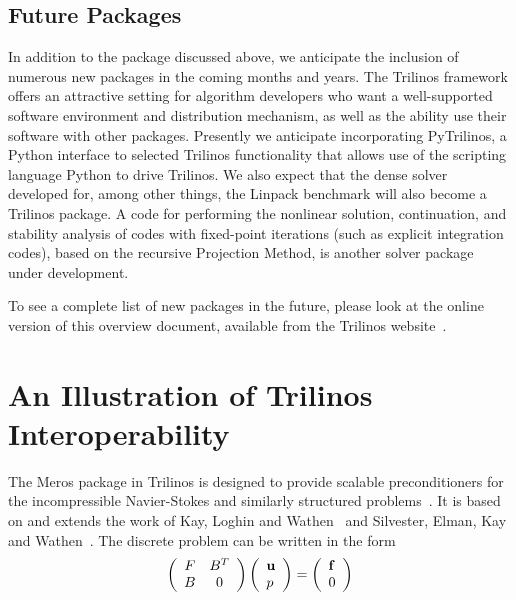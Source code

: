 \documentclass[acmtoms,acmnow]{acmtrans2m}
\begin{document}
\subsection{Future Packages}

In addition to the package discussed above, we anticipate the
inclusion of numerous new packages in the coming months and years.
The Trilinos framework offers an attractive setting for algorithm
developers who want a well-supported software environment and
distribution mechanism, as well as the ability use their software with
other packages.  Presently we anticipate incorporating PyTrilinos, a
Python interface to selected Trilinos functionality that allows use of
the scripting language Python to drive Trilinos.  We also expect that
the dense solver developed for, among other things, the Linpack
benchmark will also become a Trilinos package. A code for
performing the nonlinear solution, continuation, and stability 
analysis of codes with fixed-point iterations (such as explicit
integration codes), based on the recursive Projection Method, is
another solver package under development.

To see a complete list of new packages in the future, please look at
the online version of this overview document, available from the
Trilinos website~\cite{Trilinos-home-page}.

\section{An Illustration of Trilinos Interoperability}
\label{sect:meros}

The Meros package in Trilinos is designed to provide scalable
preconditioners for the incompressible Navier-Stokes and similarly
structured problems~\cite{ElmaHowlShadTumi2003}.  
It is based on and extends the work of Kay,
Loghin and Wathen~\cite{KayLoghWath2002} and Silvester, Elman, Kay and
Wathen~\cite{SilvElmaKayWath2001}.  
The discrete problem can be written in the form
\begin{equation}
\label{eq:NSmatrix}
\left(\begin{array}{cc}
	F & B^T \\
	B & 0 \\
\end{array}\right)
\left(\begin{array}{l}
	{\bf u} \\
	p \\
\end{array}\right)
=
\left(\begin{array}{l}
	{\bf f} \\
	0 \\
	\end{array}\right)
\end{equation}
\end{document}
